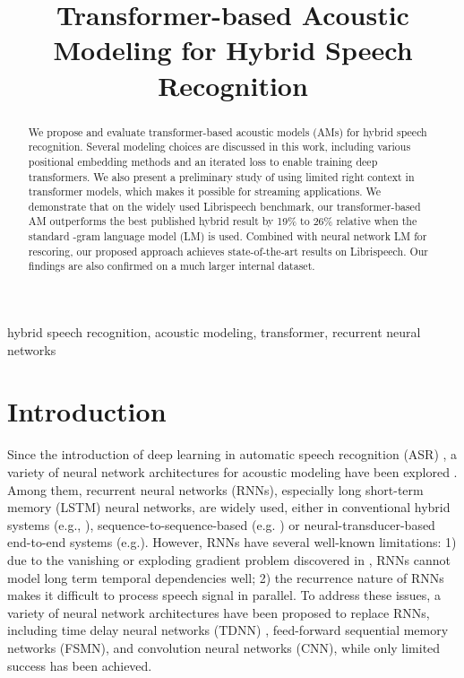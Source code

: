 \documentclass{article}
\title{Transformer-based Acoustic Modeling for Hybrid  Speech Recognition}
\begin{document}
\ninept
\maketitle
\begin{abstract}\vspace{0.5em}
We propose and evaluate transformer-based acoustic models (AMs) for hybrid speech recognition. Several modeling choices are discussed in this work, including various positional embedding methods and an iterated loss to enable training deep transformers. We also present a preliminary study of using limited right context in transformer models, which makes it possible for streaming applications. We demonstrate that on the widely used Librispeech benchmark, our transformer-based AM outperforms the best published hybrid result by 19\% to 26\% relative when the standard -gram language model (LM) is used. Combined with neural network LM for rescoring, our proposed approach achieves state-of-the-art results on Librispeech. Our findings are also confirmed on a much larger internal dataset.

\end{abstract}
\begin{keywords}
hybrid speech recognition, acoustic modeling, transformer, recurrent neural networks
\end{keywords}
\section{Introduction}
\label{sec:intro}

Since the introduction of deep learning in automatic speech recognition (ASR) \cite{hinton2012deep}, a variety of neural network architectures for acoustic modeling have been explored \cite{seide2011conversational, sak2014long, abdel2014convolutional, peddinti2015time, zhang2015feedforward}. Among them, recurrent neural networks (RNNs), especially long short-term memory (LSTM)\cite{hochreiter1997long} neural networks, are widely used, either in conventional hybrid systems (e.g., \cite{sak2014long, bahdanau2016end}), sequence-to-sequence-based (e.g. \cite{chiu2018state, park2019specaugment}) or neural-transducer-based end-to-end systems (e.g.\cite{he2019rnnt}). However, RNNs have several well-known limitations: 1) due to the vanishing or exploding gradient problem discovered in \cite{bengio1994learning}, RNNs cannot model long term temporal dependencies well; 2) the recurrence nature of RNNs makes it difficult to process speech signal in parallel. To address these issues, a variety of neural network architectures have been proposed to replace RNNs, including time delay neural networks (TDNN) \cite{peddinti2015time}, feed-forward sequential memory networks (FSMN)\cite{zhang2015feedforward}, and convolution neural networks (CNN)\cite{abdel2014convolutional, collobert2016wav2letter}, while only limited success has been achieved. 
\end{document}
